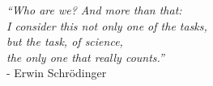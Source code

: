 \vfill

\begin{adjustwidth}{6cm}{0cm}
\begin{flushright}
\singlespacing
\emph{
``Who are we? And more than that: \\
I consider this not only one of the tasks,\\
 but \emph{the} task, of science, \\
the only one that really counts.''}\\
- Erwin Schr\"{o}dinger \cite{SchrodingerQuote}
\end{flushright}
\end{adjustwidth}
\onehalfspacing



